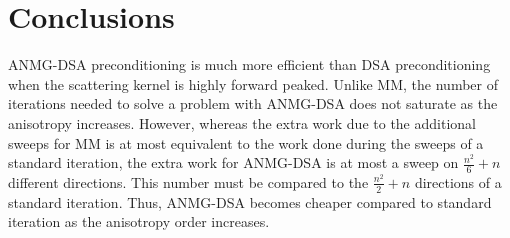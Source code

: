 \section{Conclusions}
ANMG-DSA preconditioning is much more efficient than DSA preconditioning when
the scattering kernel is highly forward peaked. Unlike MM, the number of 
iterations needed to solve a problem with ANMG-DSA does not saturate as the 
anisotropy increases. However, whereas the extra work due to the additional
sweeps for MM is at most equivalent to the work done during the sweeps of a
standard iteration, the extra work for ANMG-DSA is at most a sweep on 
$\frac{n^2}{6}+n$ different directions. This number must be compared to the 
$\frac{n^2}{2}+n$ directions of a standard iteration. Thus, ANMG-DSA becomes 
cheaper compared to standard iteration as the anisotropy order increases.
